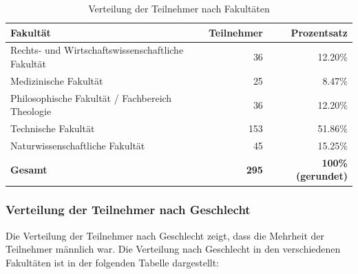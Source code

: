 \documentclass[german,report]{i1thesis}
\begin{document}
\begin{table}[H]
\centering
\begin{tabular}{|l|r|r|}
\hline
\textbf{Fakultät} & \textbf{Teilnehmer} & \textbf{Prozentsatz} \\ \hline
Rechts- und Wirtschaftswissenschaftliche Fakultät & 36 & 12.20\% \\ \hline
Medizinische Fakultät                           & 25 & 8.47\%  \\ \hline
Philosophische Fakultät / Fachbereich Theologie & 36 & 12.20\% \\ \hline
Technische Fakultät                             & 153 & 51.86\% \\ \hline
Naturwissenschaftliche Fakultät                 & 45 & 15.25\% \\ \hline
\textbf{Gesamt}                                 & \textbf{295} & \textbf{100\% (gerundet)} \\ \hline
\end{tabular}
\caption{Verteilung der Teilnehmer nach Fakultäten}
\end{table}

\subsubsection{Verteilung der Teilnehmer nach Geschlecht}
Die Verteilung der Teilnehmer nach Geschlecht zeigt, dass die Mehrheit der Teilnehmer männlich war. Die Verteilung nach Geschlecht in den verschiedenen Fakultäten ist in der folgenden Tabelle dargestellt:
\end{document}
